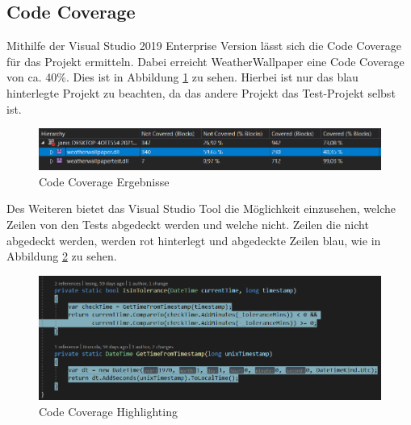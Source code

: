 \subsection{Code Coverage}
Mithilfe der Visual Studio 2019 Enterprise Version lässt sich die Code Coverage für das Projekt ermitteln. Dabei erreicht WeatherWallpaper eine Code Coverage von ca. 40\%. Dies ist in Abbildung \ref{CodeCoverage} zu sehen. Hierbei ist nur das blau hinterlegte Projekt zu beachten, da das andere Projekt das Test-Projekt selbst ist. 
\begin{figure}[ht]
\centering
\includegraphics[width=\textwidth]{Bilder/CodeCoverage}
\caption[Code Coverage Ergebnisse]{\label{CodeCoverage} Code Coverage Ergebnisse}
\end{figure}
Des Weiteren bietet das Visual Studio Tool die Möglichkeit einzusehen, welche Zeilen von den Tests abgedeckt werden und welche nicht. Zeilen die nicht abgedeckt werden, werden rot hinterlegt und abgedeckte Zeilen blau, wie in Abbildung \ref{CodeCoverageHighlight} zu sehen.
\begin{figure}[ht]
\centering
\includegraphics[width=\textwidth]{Bilder/CodeCoverageHighlighted}
\caption[Code Coverage Ergebnisse]{\label{CodeCoverageHighlight} Code Coverage Highlighting}
\end{figure}